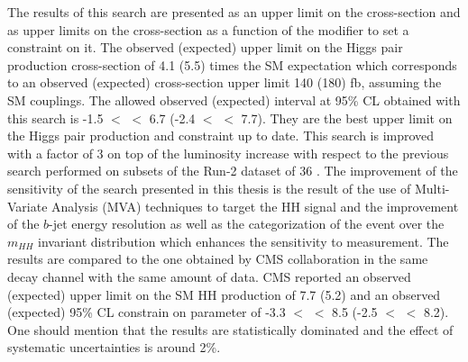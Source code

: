 The results of this search are presented as an upper limit on the cross-section and as upper limits on the cross-section as a function of the \kl modifier to set a constraint on it. The observed (expected) upper limit on the Higgs pair production cross-section of 4.1 (5.5) times the SM expectation which corresponds to an observed (expected) cross-section upper limit 140 (180) fb, assuming the SM couplings. The allowed observed (expected) interval at 95\% CL obtained with this search is -1.5 $<$ \kl $<$ 6.7 (-2.4 $<$ \kl $<$ 7.7). They are the best upper limit on the Higgs pair production and \kl constraint up to date. This search is improved with a factor of 3 on top of the luminosity increase with respect to the previous search performed on subsets of the Run-2 dataset of 36 \ifb. The improvement of the sensitivity of the search presented in this thesis is the result of the use of Multi-Variate Analysis (MVA) techniques to target the HH signal and the improvement of the $b$-jet energy resolution as well as the categorization of the event over the $m_{HH}$ invariant distribution which enhances the sensitivity to \kl measurement. The results are compared to the one obtained by CMS collaboration in the same decay channel with the same amount of data. CMS reported an observed (expected) upper limit on the SM HH production of 7.7 (5.2) and an observed (expected) 95\% CL constrain on \kl parameter of -3.3 $<$ \kl $<$ 8.5 (-2.5 $<$ \kl $<$ 8.2). One should mention that the results are statistically dominated and the effect of systematic uncertainties is around 2\%. \\

